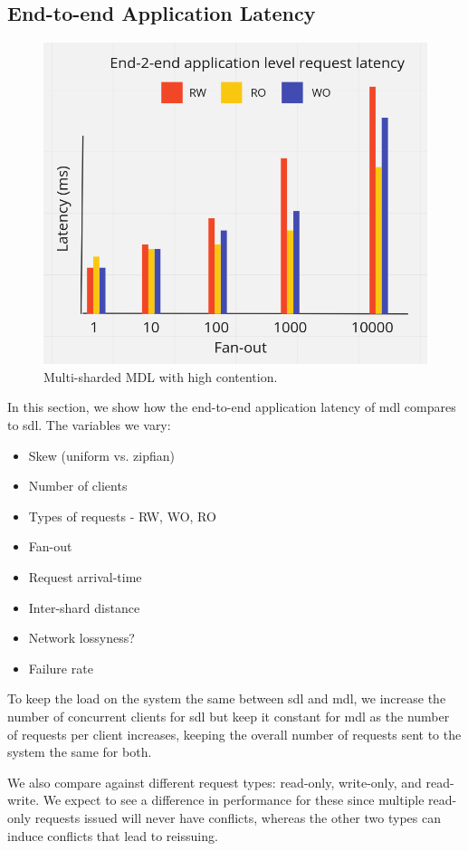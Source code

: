 \subsection{End-to-end Application Latency}
\begin{figure}[!htb]
\includegraphics[scale=.27]{e2e-with-contention.png}
\caption{Multi-sharded MDL with high contention.}
\label{fig:e2e-contention}
\end{figure}
In this section, we show how the end-to-end application latency of mdl compares to sdl.
The variables we vary:
\begin{itemize}
    \item Skew (uniform vs. zipfian)
    \item Number of clients
    \item Types of requests - RW, WO, RO
    \item Fan-out
    \item Request arrival-time
    \item Inter-shard distance
    \item Network lossyness?
    \item Failure rate
\end{itemize}
To keep the load on the system the same between sdl and mdl, we increase the number of concurrent clients for sdl but keep it constant for mdl as the number of requests per client increases, keeping the overall number of requests sent to the system the same for both.

We also compare against different request types: read-only, write-only, and read-write. We expect to see a difference in performance for these since multiple read-only requests issued will never have conflicts, whereas the other two types can induce conflicts that lead to reissuing.

